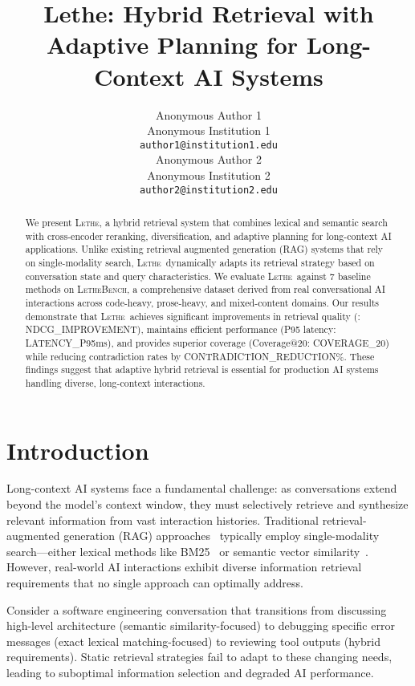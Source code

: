 \documentclass[letterpaper]{article}
\title{Lethe: Hybrid Retrieval with Adaptive Planning for Long-Context AI Systems}
\author{%
  Anonymous Author 1 \\
  Anonymous Institution 1 \\
  \texttt{author1@institution1.edu} \\
  \And
  Anonymous Author 2 \\
  Anonymous Institution 2 \\
  \texttt{author2@institution2.edu} \\
}
\newcommand{\lethe}{\textsc{Lethe}}
\newcommand{\lethebench}{\textsc{LetheBench}}
\begin{document}
\maketitle

\begin{abstract}
We present \lethe, a hybrid retrieval system that combines lexical and semantic search with cross-encoder reranking, diversification, and adaptive planning for long-context AI applications. Unlike existing retrieval augmented generation (RAG) systems that rely on single-modality search, \lethe\ dynamically adapts its retrieval strategy based on conversation state and query characteristics. We evaluate \lethe\ against 7 baseline methods on \lethebench, a comprehensive dataset derived from real conversational AI interactions across code-heavy, prose-heavy, and mixed-content domains. Our results demonstrate that \lethe\ achieves significant improvements in retrieval quality (: {{NDCG_IMPROVEMENT}}), maintains efficient performance (P95 latency: {{LATENCY_P95}}ms), and provides superior coverage (Coverage@20: {{COVERAGE_20}}) while reducing contradiction rates by {{CONTRADICTION_REDUCTION}}\%. These findings suggest that adaptive hybrid retrieval is essential for production AI systems handling diverse, long-context interactions.
\end{abstract}

\section{Introduction}

Long-context AI systems face a fundamental challenge: as conversations extend beyond the model's context window, they must selectively retrieve and synthesize relevant information from vast interaction histories. Traditional retrieval-augmented generation (RAG) approaches~\citep{lewis2020retrieval} typically employ single-modality search—either lexical methods like BM25~\citep{robertson2009probabilistic} or semantic vector similarity~\citep{karpukhin2020dense}. However, real-world AI interactions exhibit diverse information retrieval requirements that no single approach can optimally address.

Consider a software engineering conversation that transitions from discussing high-level architecture (semantic similarity-focused) to debugging specific error messages (exact lexical matching-focused) to reviewing tool outputs (hybrid requirements). Static retrieval strategies fail to adapt to these changing needs, leading to suboptimal information selection and degraded AI performance.
\end{document}
